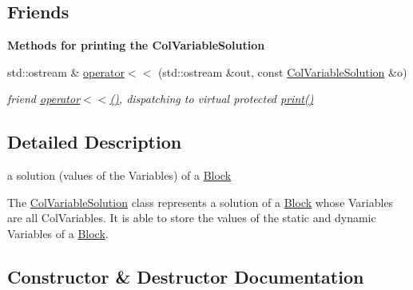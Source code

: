 \subsection*{Friends}
\begin{Indent}\textbf{ Methods for printing the Col\+Variable\+Solution}\par
\begin{DoxyCompactItemize}
\item 
std\+::ostream \& \mbox{\hyperlink{class_s_m_spp__di__unipi__it_1_1_col_variable_solution_a1529e2cc6b571cfe0bd3dd0cfb82b587}{operator$<$$<$}} (std\+::ostream \&out, const \mbox{\hyperlink{class_s_m_spp__di__unipi__it_1_1_col_variable_solution}{Col\+Variable\+Solution}} \&o)
\begin{DoxyCompactList}\small\item\em friend \mbox{\hyperlink{class_s_m_spp__di__unipi__it_1_1_col_variable_solution_a1529e2cc6b571cfe0bd3dd0cfb82b587}{operator$<$$<$()}}, dispatching to virtual protected \mbox{\hyperlink{class_s_m_spp__di__unipi__it_1_1_col_variable_solution_a59a9fcbf8f9f86d348344b2073644b0e}{print()}} \end{DoxyCompactList}\end{DoxyCompactItemize}
\end{Indent}


\subsection{Detailed Description}
a solution (values of the Variables) of a \mbox{\hyperlink{class_s_m_spp__di__unipi__it_1_1_block}{Block}} 

The \mbox{\hyperlink{class_s_m_spp__di__unipi__it_1_1_col_variable_solution}{Col\+Variable\+Solution}} class represents a solution of a \mbox{\hyperlink{class_s_m_spp__di__unipi__it_1_1_block}{Block}} whose Variables are all Col\+Variables. It is able to store the values of the static and dynamic Variables of a \mbox{\hyperlink{class_s_m_spp__di__unipi__it_1_1_block}{Block}}. 

\subsection{Constructor \& Destructor Documentation}
\mbox{\label{class_s_m_spp__di__unipi__it_1_1_col_variable_solution_a688ff4c13d6190fc4e6b9de1c0e8e94a}} 
